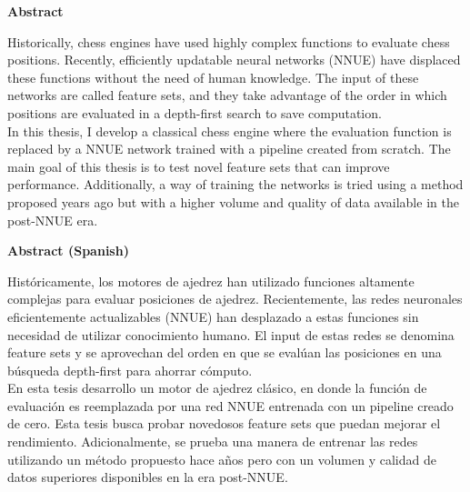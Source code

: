 \thispagestyle{plain}
\begin{center}
\large
\textbf{Abstract}
\end{center}

\begin{center}
\parbox{15cm}{
Historically, chess engines have used highly complex functions to evaluate chess positions. Recently, efficiently updatable neural networks (NNUE) have displaced these functions without the need of human knowledge. The input of these networks are called feature sets, and they take advantage of the order in which positions are evaluated in a depth-first search to save computation. \\

In this thesis, I develop a classical chess engine where the evaluation function is replaced by a NNUE network trained with a pipeline created from scratch. The main goal of this thesis is to test novel feature sets that can improve performance. Additionally, a way of training the networks is tried using a method proposed years ago but with a higher volume and quality of data available in the post-NNUE era.
}
\end{center}

\vspace{1cm}

\begin{center}
\large
\textbf{Abstract (Spanish)}
\end{center}

\begin{center}
\parbox{15cm}{
Históricamente, los motores de ajedrez han utilizado funciones altamente complejas para evaluar posiciones de ajedrez. Recientemente, las redes neuronales eficientemente actualizables (NNUE) han desplazado a estas funciones sin necesidad de utilizar conocimiento humano. El input de estas redes se denomina feature sets y se aprovechan del orden en que se evalúan las posiciones en una búsqueda depth-first para ahorrar cómputo. \\

En esta tesis desarrollo un motor de ajedrez clásico, en donde la función de evaluación es reemplazada por una red NNUE entrenada con un pipeline creado de cero. Esta tesis busca probar novedosos feature sets que puedan mejorar el rendimiento. Adicionalmente, se prueba una manera de entrenar las redes utilizando un método propuesto hace años pero con un volumen y calidad de datos superiores disponibles en la era post-NNUE.
}
\end{center}

\clearpage
